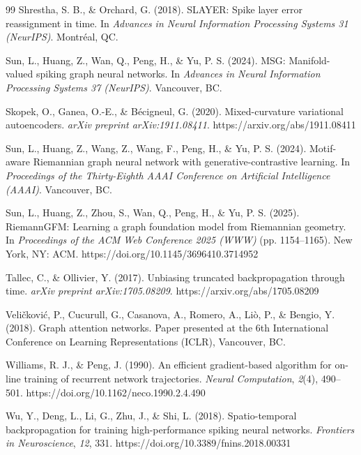 \documentclass[a4paper,fleqn]{cas-dc}
\begin{document}
\begin{thebibliography}{99}
Shrestha, S. B., \& Orchard, G. (2018). SLAYER: Spike layer error reassignment in time. In \textit{Advances in Neural Information Processing Systems 31 (NeurIPS)}. Montr\'eal, QC.

Sun, L., Huang, Z., Wan, Q., Peng, H., \& Yu, P. S. (2024). MSG: Manifold-valued spiking graph neural networks. In \textit{Advances in Neural Information Processing Systems 37 (NeurIPS)}. Vancouver, BC.

Skopek, O., Ganea, O.-E., \& B\'ecigneul, G. (2020). Mixed-curvature variational autoencoders. \textit{arXiv preprint arXiv:1911.08411}. https://arxiv.org/abs/1911.08411

Sun, L., Huang, Z., Wang, Z., Wang, F., Peng, H., \& Yu, P. S. (2024). Motif-aware Riemannian graph neural network with generative-contrastive learning. In \textit{Proceedings of the Thirty-Eighth AAAI Conference on Artificial Intelligence (AAAI)}. Vancouver, BC.

Sun, L., Huang, Z., Zhou, S., Wan, Q., Peng, H., \& Yu, P. S. (2025). RiemannGFM: Learning a graph foundation model from Riemannian geometry. In \textit{Proceedings of the ACM Web Conference 2025 (WWW)} (pp. 1154--1165). New York, NY: ACM. https://doi.org/10.1145/3696410.3714952

Tallec, C., \& Ollivier, Y. (2017). Unbiasing truncated backpropagation through time. \textit{arXiv preprint arXiv:1705.08209}. https://arxiv.org/abs/1705.08209

Veli\v{c}kovi\'c, P., Cucurull, G., Casanova, A., Romero, A., Li\`o, P., \& Bengio, Y. (2018). Graph attention networks. Paper presented at the 6th International Conference on Learning Representations (ICLR), Vancouver, BC.

Williams, R. J., \& Peng, J. (1990). An efficient gradient-based algorithm for on-line training of recurrent network trajectories. \textit{Neural Computation}, \textit{2}(4), 490--501. https://doi.org/10.1162/neco.1990.2.4.490

Wu, Y., Deng, L., Li, G., Zhu, J., \& Shi, L. (2018). Spatio-temporal backpropagation for training high-performance spiking neural networks. \textit{Frontiers in Neuroscience}, \textit{12}, 331. https://doi.org/10.3389/fnins.2018.00331


\end{thebibliography}
\end{document}
